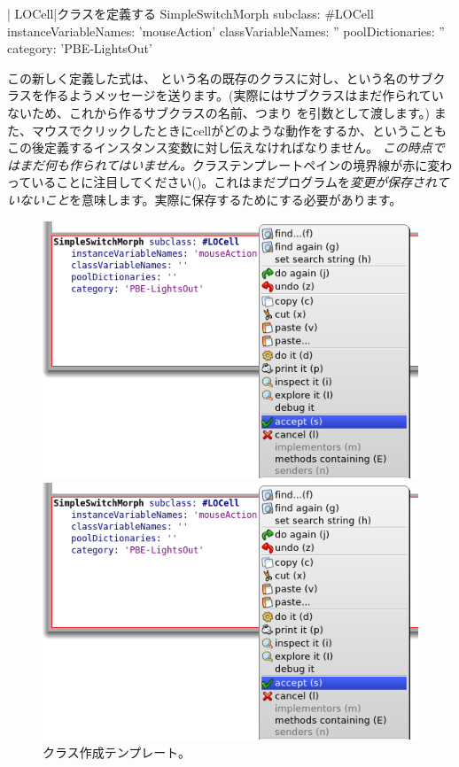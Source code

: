 \documentclass[a4paper,10pt,twoside]{book}
\begin{document}
\begin{classdef}[firstClassDef]{\ct| LOCell|クラスを定義する}
SimpleSwitchMorph subclass: #LOCell
   instanceVariableNames: 'mouseAction'
   classVariableNames: ''
   poolDictionaries: ''
   category: 'PBE-LightsOut'
\end{classdef}

この新しく定義した\st{}式は、 という名の既存のクラスに対し、という名のサブクラスを作るようメッセージを送ります。(実際にはサブクラスはまだ作られていないため、これから作るサブクラスの名前、つまり を引数として渡します。)
また、マウスでクリックしたときにcellがどのような動作をするか、ということもこの後定義するインスタンス変数に対し伝えなければなりません。
\emph{この時点ではまだ何も作られてはいません。}クラステンプレートペインの境界線が赤に変わっていることに注目してください()。これはまだプログラムを\emph{変更が保存されていないこと}を意味します。実際に保存するためにする必要があります。

\begin{figure}[h!t]
\ifluluelse
	{\centerline {\includegraphics[width=\textwidth]{AcceptClassDef}}}
	{\centerline {\includegraphics[scale=0.7]{AcceptClassDef}}}
\caption{クラス作成テンプレート。
}
\end{figure}
\end{document}

